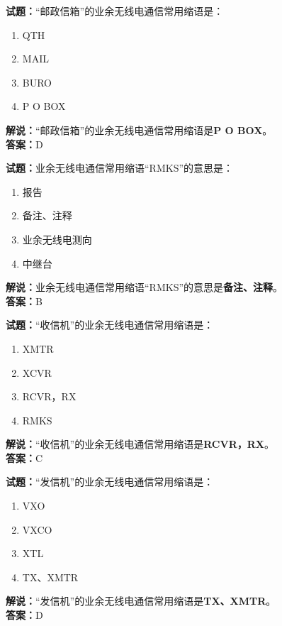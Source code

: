 \documentclass{ctexbook}
\begin{document}
\vspace{1em}

\textbf{试题：}“邮政信箱”的业余无线电通信常用缩语是：
\begin{enumerate}[leftmargin=3em]
  \item QTH
  \item MAIL
  \item BURO
  \item P O BOX
\end{enumerate}
\noindent\textbf{解说：}“邮政信箱”的业余无线电通信常用缩语是\textbf{P O BOX}。\\\noindent\textbf{答案：}D

\vspace{1em}

\textbf{试题：}业余无线电通信常用缩语“RMKS”的意思是：
\begin{enumerate}[leftmargin=3em]
  \item 报告
  \item 备注、注释
  \item 业余无线电测向
  \item 中继台
\end{enumerate}
\noindent\textbf{解说：}业余无线电通信常用缩语“RMKS”的意思是\textbf{备注、注释}。\\\noindent\textbf{答案：}B

\vspace{1em}

\textbf{试题：}“收信机”的业余无线电通信常用缩语是：
\begin{enumerate}[leftmargin=3em]
  \item XMTR
  \item XCVR
  \item RCVR，RX
  \item RMKS
\end{enumerate}
\noindent\textbf{解说：}“收信机”的业余无线电通信常用缩语是\textbf{RCVR，RX}。\\\noindent\textbf{答案：}C

\vspace{1em}

\textbf{试题：}“发信机”的业余无线电通信常用缩语是：
\begin{enumerate}[leftmargin=3em]
  \item VXO
  \item VXCO
  \item XTL
  \item TX、XMTR
\end{enumerate}
\noindent\textbf{解说：}“发信机”的业余无线电通信常用缩语是\textbf{TX、XMTR}。\\\noindent\textbf{答案：}D
\end{document}

